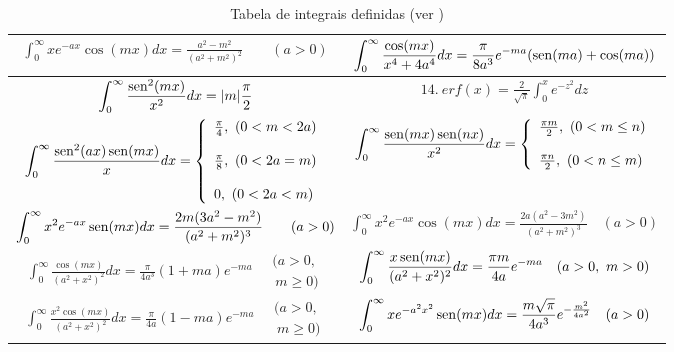\begin{table}
\begin{small}
\begin{center}
{\begin{tabular}{|c|c|}
$\displaystyle \int_0^\infty xe^{-ax}\cos(mx)dx=\frac{a^2-m^2}{(a^2+m^2)^2}\qquad (a>0) $&$\displaystyle \int_0^\infty \frac{\cos(mx)}{x^4+4a^4}dx=\frac{\pi}{8a^3}e^{-ma}(\operatorname{sen}(ma)+\cos(ma)) $ \\[2ex] \hline
$\displaystyle \int_0^\infty \frac{\operatorname{sen}^2(mx)}{x^2}dx=|m|\frac{\pi}{2} $& $\displaystyle 14.\ erf(x)=\frac{2}{\sqrt{\pi}}\int_0^x e^{-z^2}dz $ \\[2ex] \hline
$\displaystyle \int_0^\infty \frac{\sen^2(ax)\sen(mx)}{x}dx=\left\{\begin{array}{l}\frac{\pi }{4},\ (0<m<2a)\\\\\frac{\pi }{8},\ (0<2a=m)\\\\ 0,\ (0<2a<m) \end{array}\right. $& $\displaystyle \int_0^\infty \frac{\sen(mx)\sen(nx)}{x^2}dx=\left\{\begin{array}{l}\frac{\pi m}{2},\ (0<m\leq n)\\\\\frac{\pi n}{2},\ (0<n\leq m) \end{array}\right. $ \\[2ex] \hline
$\displaystyle \int_0^\infty x^2e^{-ax}\operatorname{sen}(mx)dx=\frac{2m(3a^2-m^2)}{(a^2+m^2)^3}\qquad (a>0) $& $\displaystyle \int_0^\infty x^2e^{-ax}\cos(mx)dx=\frac{2a(a^2-3m^2)}{(a^2+m^2)^3}\quad (a>0) $ \\[2ex] \hline
$\displaystyle \int_0^\infty \frac{\cos(mx)}{(a^2+x^2)^2}dx=\frac{\pi}{4a^3}(1+ma)e^{-ma}\quad \begin{array}{l}\!\!(a>0,\\ \ m\geq 0)\end{array} $& $\displaystyle \int_0^\infty \frac{x\operatorname{sen}(mx)}{(a^2+x^2)^2}dx=\frac{\pi m}{4a}e^{-ma} \quad (a>0,\ m>0) $ \\[2ex] \hline
$\displaystyle \int_0^\infty \frac{x^2\cos(mx)}{(a^2+x^2)^2}dx=\frac{\pi}{4a}(1-ma)e^{-ma}\quad \begin{array}{l}\!\!(a>0,\\ \ m\geq 0)\end{array} $& $\displaystyle \int_0^\infty xe^{-a^2x^2}\operatorname{sen}(mx)dx=\frac{ m \sqrt{\pi}}{4a^3}e^{-\frac{m^2}{4a^2}} \quad (a>0) $\\ \hline
\end{tabular}}

\caption{\label{tab_int_def}Tabela de integrais definidas (ver \cite{DWIGHT})}
\end{center}
\end{small}
\end{table}

